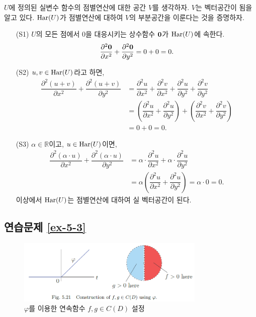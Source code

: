 $U$에 정의된 실변수 함수의 점별연산에 대한 공간 $V$를 생각하자.
$V$는 벡터공간이 됨을 알고 있다.
$\mathop{\mathrm{Har}}(U)$가 점별연산에 대하여 $V$의 부분공간을 이룬다는 것을 증명하자.
\begin{itemize}
\item[(S1)]
$U$의 모든 점에서 $0$을 대응시키는 상수함수 $\boldsymbol 0$가 $\mathop{\mathrm{Har}}(U)$에 속한다.
\[
\displaystyle\frac{\partial^2 \boldsymbol 0}{\partial x^2} + \displaystyle\frac{\partial^2 \boldsymbol 0}{\partial y^2} = 0+0=0.
\]
\item[(S2)] $u,v\in \mathop{\mathrm{Har}}(U)$라고 하면,
\begin{align*}
\dfrac{\partial^2 (u+v)}{\partial x^2} + \dfrac{\partial^2 (u+v)}{\partial y^2}
&= \dfrac{\partial^2 u}{\partial x^2} + \dfrac{\partial^2 v}{\partial x^2}
+ \dfrac{\partial^2 u}{\partial y^2}+ \dfrac{\partial^2 v}{\partial y^2} \\ 
&= \left(\dfrac{\partial^2 u}{\partial x^2} + \dfrac{\partial^2 u}{\partial y^2} \right)
+ \left( \dfrac{\partial^2 v}{\partial x^2} + \dfrac{\partial^2 v}{\partial y^2} \right) \\
&= 0+0=0.
\end{align*}
\item[(S3)] $\alpha\in\mathbb R$이고, $u\in\mathop{\mathrm{Har}}(U)$이면,
\begin{align*}
\dfrac{\partial^2 (\alpha\cdot u)}{\partial x^2} + \dfrac{\partial^2 (\alpha\cdot u)}{\partial y^2}
&= \alpha\cdot \dfrac{\partial^2 u}{\partial x^2} 
+ \alpha \cdot \dfrac{\partial^2 u}{\partial y^2} \\
&= \alpha \left( \dfrac{\partial^2 u}{\partial x^2} + \dfrac{\partial^2 u}{\partial y^2} \right)
= \alpha\cdot 0 = 0.
\end{align*}
이상에서 $\mathop{\mathrm{Har}}(U)$는 점별연산에 대하여 실 벡터공간이 된다.
\end{itemize}

\subsection*{연습문제 \ref{ex-5-3}}


\begin{figure}[h!]
\begin{center}
\includegraphics[width=0.8\textwidth]{./figs/fig-5-21}
\end{center}
\caption{$\varphi$를 이용한 연속함수 $f,g\in C(D)$ 설정
}
\label{fig-5-21}
\end{figure}






